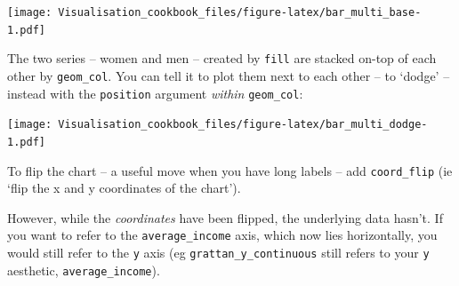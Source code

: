 \documentclass[]{book}
\newenvironment{Shaded}{\begin{snugshade}}{\end{snugshade}}
\newcommand{\CommentTok}[1]{\textcolor[rgb]{0.56,0.35,0.01}{\textit{#1}}}
\newcommand{\DataTypeTok}[1]{\textcolor[rgb]{0.13,0.29,0.53}{#1}}
\newcommand{\KeywordTok}[1]{\textcolor[rgb]{0.13,0.29,0.53}{\textbf{#1}}}
\newcommand{\NormalTok}[1]{#1}
\newcommand{\OperatorTok}[1]{\textcolor[rgb]{0.81,0.36,0.00}{\textbf{#1}}}
\newcommand{\StringTok}[1]{\textcolor[rgb]{0.31,0.60,0.02}{#1}}
\begin{document}
\begin{Shaded}
\end{Shaded}

\texttt{[image: Visualisation\_cookbook\_files/figure-latex/bar\_multi\_base-1.pdf]}

The two series -- women and men -- created by \texttt{fill} are stacked on-top of each other by \texttt{geom\_col}. You can tell it to plot them next to each other -- to `dodge' -- instead with the \texttt{position} argument \emph{within} \texttt{geom\_col}:

\begin{Shaded}
\end{Shaded}

\texttt{[image: Visualisation\_cookbook\_files/figure-latex/bar\_multi\_dodge-1.pdf]}

To flip the chart -- a useful move when you have long labels -- add \texttt{coord\_flip} (ie `flip the x and y coordinates of the chart').

However, while the \emph{coordinates} have been flipped, the underlying data hasn't. If you want to refer to the \texttt{average\_income} axis, which now lies horizontally, you would still refer to the \texttt{y} axis (eg \texttt{grattan\_y\_continuous} still refers to your \texttt{y} aesthetic, \texttt{average\_income}).

\begin{Shaded}
\end{Shaded}
\end{document}

